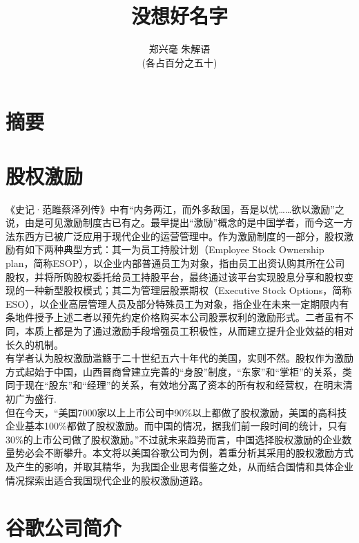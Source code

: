 \documentclass{article}
\begin{document}
\begin{CJK}{UTF8}{gbsn}
\title{没想好名字}
\author{郑兴毫 朱解语 
      \\(各占百分之五十)}
\date{}
\maketitle
\renewcommand{\contentsname}{目录}
\tableofcontents
\section{摘要}

\label{sec:introduction}
\section{股权激励}
《史记·范雎蔡泽列传》中有“内务两江，而外多敌国，吾是以忧……欲以激励”之说，由是可见激励制度古已有之。最早提出“激励”概念的是中国学者，而今这一方法东西方已被广泛应用于现代企业的运营管理中。作为激励制度的一部分，股权激励有如下两种典型方式：其一为员工持股计划（Employee Stock Ownership plan，简称ESOP），以企业内部普通员工为对象，指由员工出资认购其所在公司股权，并将所购股权委托给员工持股平台，最终通过该平台实现股息分享和股权变现的一种新型股权模式；其二为管理层股票期权（Executive Stock Options，简称ESO），以企业高层管理人员及部分特殊员工为对象，指企业在未来一定期限内有条地件授予上述二者以预先约定价格购买本公司股票权利的激励形式。二者虽有不同，本质上都是为了通过激励手段增强员工积极性，从而建立提升企业效益的相对长久的机制。\\

有学者认为股权激励滥觞于二十世纪五六十年代的美国，实则不然。股权作为激励方式起始于中国，山西晋商曾建立完善的“身股”制度，“东家”和“掌柜”的关系，类同于现在“股东”和“经理”的关系，有效地分离了资本的所有权和经营权，在明末清初广为盛行.\\

但在今天，“美国7000家以上上市公司中90\%以上都做了股权激励，美国的高科技企业基本100\%都做了股权激励。而中国的情况，据我们前一段时间的统计，只有30\%的上市公司做了股权激励。”不过就未来趋势而言，中国选择股权激励的企业数量势必会不断攀升。本文将以美国谷歌公司为例，着重分析其采用的股权激励方式及产生的影响，并取其精华，为我国企业思考借鉴之处，从而结合国情和具体企业情况探索出适合我国现代企业的股权激励道路。
\section{谷歌公司简介}


\end{CJK}
\end{document}
